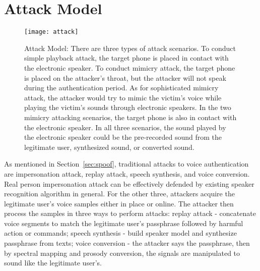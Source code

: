 \section{Attack Model}
\label{sec:attack}
\begin{figure*}[h]
	\centering
	\texttt{[image: attack]}
	\caption[MoVo Attack Model]{Attack Model: There are three types of attack scenarios. To conduct simple playback attack, the target phone is placed in contact with the electronic speaker. To conduct mimicry attack, the target phone is placed on the attacker's throat, but the attacker will not speak during the authentication period. As for sophisticated mimicry attack, the attacker would try to mimic the victim's voice while playing the victim's sounds through electronic speakers. In the two mimicry attacking scenarios, the target phone is also in contact with the electronic speaker. In all three scenarios, the sound played by the electronic speaker could be the pre-recorded sound from the legitimate user, synthesized sound, or converted sound.}
	\label{fig:attack}
\end{figure*}
%

As mentioned in Section~\ref{sec:spoof}, traditional attacks to voice authentication are impersonation attack, replay attack, speech synthesis, and voice conversion. 
%
Real person impersonation attack can be effectively defended by existing speaker recognition algorithm in general. For the other three,  attackers acquire the legitimate user's voice samples either in place or online. The attacker then process the samples in three ways to perform attacks: replay attack - concatenate voice segments to match the legitimate user's passphrase followed by harmful action or commands; speech synthesis - build speaker model and synthesize passphrase from texts; voice conversion - the attacker says the passphrase, then by spectral mapping and prosody conversion, the signals are manipulated to sound like the legitimate user's.  

